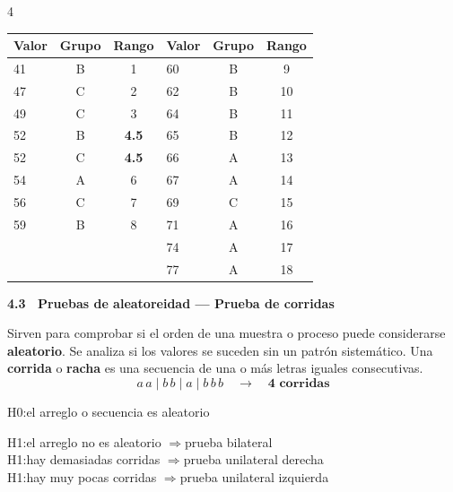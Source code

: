 \documentclass[10pt,a4paper,landscape]{article}
\newcommand{\chico}{\fontsize{4.2}{4.6}\selectfont}
\newcommand{\tema}[1]{%
  \par\vspace{2pt}%
  \noindent\colorbox{black!16}{\parbox{\dimexpr\linewidth-2\fboxsep\relax}{%
    \fontsize{5.7}{6.6}\selectfont\bfseries #1\strut}}%
  \par\vspace{0.8pt}}
\newcommand{\sub}[1]{\par\vspace{0.8pt}{\fontsize{5.3}{6.1}\selectfont\bfseries #1}\par\vspace{0.4pt}}
\begin{document}
\begin{multicols}{4}
\begin{center}
{\chico
\setlength{\tabcolsep}{2.2pt}
\begin{tabular}{|l c c c|l c c c|}
\hline
Valor & Grupo & \multicolumn{2}{c|}{Rango} & Valor & Grupo & \multicolumn{2}{c|}{Rango} \\
\hline
41 & B & \multicolumn{2}{c|}{1} & 60 & B & \multicolumn{2}{c|}{9} \\
47 & C & \multicolumn{2}{c|}{2} & 62 & B & \multicolumn{2}{c|}{10} \\
49 & C & \multicolumn{2}{c|}{3} & 64 & B & \multicolumn{2}{c|}{11} \\
52 & B & \multicolumn{2}{c|}{\textbf{4.5}} & 65 & B & \multicolumn{2}{c|}{12} \\
52 & C & \multicolumn{2}{c|}{\textbf{4.5}} & 66 & A & \multicolumn{2}{c|}{13} \\
54 & A & \multicolumn{2}{c|}{6} & 67 & A & \multicolumn{2}{c|}{14} \\
56 & C & \multicolumn{2}{c|}{7} & 69 & C & \multicolumn{2}{c|}{15} \\
59 & B & \multicolumn{2}{c|}{8} & 71 & A & \multicolumn{2}{c|}{16} \\
 & & \multicolumn{2}{c|}{} & 74 & A & \multicolumn{2}{c|}{17} \\
 & & \multicolumn{2}{c|}{} & 77 & A & \multicolumn{2}{c|}{18} \\
\hline
\end{tabular}
}
\end{center}

\tema{4.3 \ Pruebas de aleatoreidad --- Prueba de corridas}

Sirven para comprobar si el orden de una muestra o proceso puede considerarse \textbf{aleatorio}. Se analiza si los valores se suceden sin un patrón sistemático. Una \textbf{corrida} o \textbf{racha} es una secuencia de una o más letras iguales consecutivas.
\[
a\,a \mid b\,b \mid a \mid b\,b\,b \quad \longrightarrow \quad \textbf{4 corridas}
\]

\sub{Hipotesis}
H0:el arreglo o secuencia es aleatorio

H1:el arreglo no es aleatorio $\Rightarrow$prueba bilateral\\
H1:hay demasiadas corridas $\Rightarrow$prueba unilateral derecha\\
H1:hay muy pocas corridas $\Rightarrow$prueba unilateral izquierda


\end{multicols}
\end{document}
